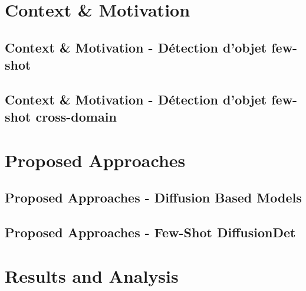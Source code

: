 \documentclass[xcolor=table, 8pt]{beamer}
\begin{document}
    \maketitle
    


    \section{Context \& Motivation}\label{sec:od-fsod}

    \subsection{Context \& Motivation - Détection d'objet few-shot}\label{subsec:few-shot-object-detection}
    
    

    \subsection{Context \& Motivation - Détection d'objet few-shot cross-domain}\label{subsec:cd-fsod}
    

    \section{Proposed Approaches}


    \subsection{Proposed Approaches - Diffusion Based Models}
    

    \subsection{Proposed Approaches - Few-Shot DiffusionDet}
    

    \section{Results and Analysis}
\end{document}
